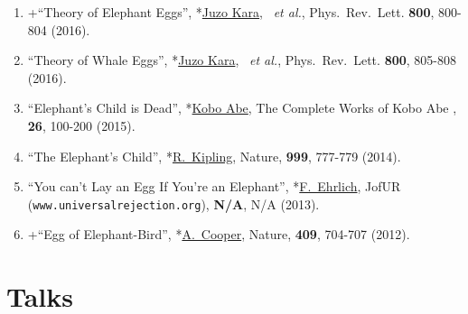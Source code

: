 \PapersInstructions	%
	\begin{enumerate}
		\item \label{pub:theegg} +``Theory of Elephant Eggs'', 
				*\underline{Juzo Kara}, \me\ {\it et al.},
				Phys.\ Rev.\ Lett. {\bf 800}, 800-804 (2016). 

		\item \label{pub:theowhale} ``Theory of Whale Eggs'',
				*\underline{Juzo Kara}, \me\ {\it et al.},
				Phys.\ Rev.\ Lett. {\bf 800}, 805-808 (2016). 
	
		\item \label{pub:abe} ``Elephant's Child is Dead'', 
				*\underline{Kobo Abe},
				The Complete Works of Kobo Abe , {\bf 26}, 100-200 (2015). 

		\item \label{pub:abe} ``The Elephant's Child'', 
				*\underline{R.~Kipling},
				Nature, {\bf 999}, 777-779 (2014). 

		\item ``You can't Lay an Egg If You're an Elephant'', 
				*\underline{F.~Ehrlich},
				JofUR\\
				 ({\tt www.universalrejection.org}), {\bf N/A}, N/A (2013). 
		\item +``Egg of Elephant-Bird'', 
				*\underline{A.~Cooper},
				Nature, {\bf 409}, 704-707 (2012). 
	\end{enumerate}




\section{Talks}


